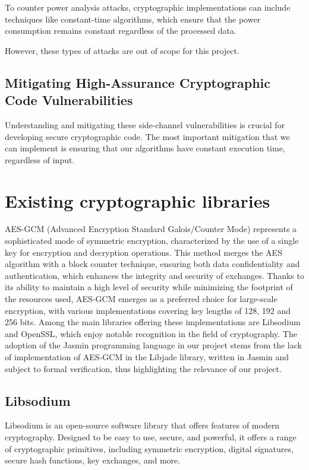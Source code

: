 \documentclass[runningheads]{llncs}
\begin{document}
To counter power analysis attacks, cryptographic implementations can include techniques like constant-time algorithms, which ensure that the power consumption remains constant regardless of the processed data.

However, these types of attacks are out of scope for this project.


\subsection{Mitigating High-Assurance Cryptographic Code Vulnerabilities}
Understanding and mitigating these side-channel vulnerabilities is crucial for developing secure cryptographic code. The most important mitigation that we can implement is ensuring that our algorithms have constant execution time, regardless of input.

\section{Existing cryptographic libraries}

AES-GCM (Advanced Encryption Standard Galois/Counter Mode) represents a sophisticated mode of symmetric encryption, characterized by the use of a single key for encryption and decryption operations. This method merges the AES algorithm with a block counter technique, ensuring both data confidentiality and authentication, which enhances the integrity and security of exchanges. Thanks to its ability to maintain a high level of security while minimizing the footprint of the resources used, AES-GCM emerges as a preferred choice for large-scale encryption, with various implementations covering key lengths of 128, 192 and 256 bits. Among the main libraries offering these implementations are Libsodium and OpenSSL, which enjoy notable recognition in the field of cryptography. The adoption of the Jasmin programming language in our project stems from the lack of implementation of AES-GCM in the Libjade library, written in Jasmin and subject to formal verification, thus highlighting the relevance of our project.

\subsection{Libsodium}

Libsodium is an open-source software library that offers features of modern cryptography. Designed to be easy to use, secure, and powerful, it offers a range of cryptographic primitives, including symmetric encryption, digital signatures, secure hash functions, key exchanges, and more.
\end{document}
